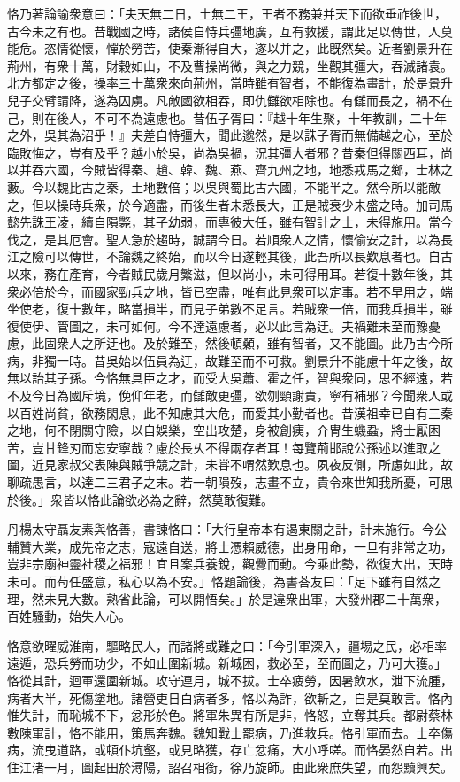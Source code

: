 \begin{pinyinscope}
恪乃著論諭衆意曰：「夫天無二日，土無二王，王者不務兼并天下而欲垂祚後世，古今未之有也。昔戰國之時，諸侯自恃兵彊地廣，互有救援，謂此足以傳世，人莫能危。恣情從懷，憚於勞苦，使秦漸得自大，遂以并之，此旣然矣。近者劉景升在荊州，有衆十萬，財穀如山，不及曹操尚微，與之力競，坐觀其彊大，吞滅諸袁。北方都定之後，操率三十萬衆來向荊州，當時雖有智者，不能復為畫計，於是景升兒子交臂請降，遂為囚虜。凡敵國欲相吞，即仇讎欲相除也。有讎而長之，禍不在己，則在後人，不可不為遠慮也。昔伍子胥曰：『越十年生聚，十年教訓，二十年之外，吳其為沼乎！』夫差自恃彊大，聞此邈然，是以誅子胥而無備越之心，至於臨敗悔之，豈有及乎？越小於吳，尚為吳禍，況其彊大者邪？昔秦但得關西耳，尚以并吞六國，今賊皆得秦、趙、韓、魏、燕、齊九州之地，地悉戎馬之鄉，士林之藪。今以魏比古之秦，土地數倍；以吳與蜀比古六國，不能半之。然今所以能敵之，但以操時兵衆，於今適盡，而後生者未悉長大，正是賊衰少未盛之時。加司馬懿先誅王淩，續自隕斃，其子幼弱，而專彼大任，雖有智計之士，未得施用。當今伐之，是其厄會。聖人急於趨時，誠謂今日。若順衆人之情，懷偷安之計，以為長江之險可以傳世，不論魏之終始，而以今日遂輕其後，此吾所以長歎息者也。自古以來，務在產育，今者賊民歲月繁滋，但以尚小，未可得用耳。若復十數年後，其衆必倍於今，而國家勁兵之地，皆已空盡，唯有此見衆可以定事。若不早用之，端坐使老，復十數年，略當損半，而見子弟數不足言。若賊衆一倍，而我兵損半，雖復使伊、管圖之，未可如何。今不達遠慮者，必以此言為迂。夫禍難未至而豫憂慮，此固衆人之所迂也。及於難至，然後頓顙，雖有智者，又不能圖。此乃古今所病，非獨一時。昔吳始以伍員為迂，故難至而不可救。劉景升不能慮十年之後，故無以詒其子孫。今恪無具臣之才，而受大吳蕭、霍之任，智與衆同，思不經遠，若不及今日為國斥境，俛仰年老，而讎敵更彊，欲刎頸謝責，寧有補邪？今聞衆人或以百姓尚貧，欲務閑息，此不知慮其大危，而愛其小勤者也。昔漢祖幸已自有三秦之地，何不閉關守險，以自娛樂，空出攻楚，身被創痍，介冑生蟣蝨，將士厭困苦，豈甘鋒刃而忘安寧哉？慮於長乆不得兩存者耳！每覽荊邯說公孫述以進取之圖，近見家叔父表陳與賊爭競之計，未甞不喟然歎息也。夙夜反側，所慮如此，故聊疏愚言，以達二三君子之末。若一朝隕歿，志畫不立，貴令來世知我所憂，可思於後。」衆皆以恪此論欲必為之辭，然莫敢復難。

丹楊太守聶友素與恪善，書諫恪曰：「大行皇帝本有遏東關之計，計未施行。今公輔贊大業，成先帝之志，寇遠自送，將士憑賴威德，出身用命，一旦有非常之功，豈非宗廟神靈社稷之福邪！宜且案兵養銳，觀釁而動。今乘此勢，欲復大出，天時未可。而苟任盛意，私心以為不安。」恪題論後，為書荅友曰：「足下雖有自然之理，然未見大數。熟省此論，可以開悟矣。」於是違衆出軍，大發州郡二十萬衆，百姓騷動，始失人心。

恪意欲曜威淮南，驅略民人，而諸將或難之曰：「今引軍深入，疆埸之民，必相率遠遁，恐兵勞而功少，不如止圍新城。新城困，救必至，至而圖之，乃可大獲。」恪從其計，迴軍還圍新城。攻守連月，城不拔。士卒疲勞，因暑飲水，泄下流腫，病者大半，死傷塗地。諸營吏日白病者多，恪以為詐，欲斬之，自是莫敢言。恪內惟失計，而恥城不下，忿形於色。將軍朱異有所是非，恪怒，立奪其兵。都尉蔡林數陳軍計，恪不能用，策馬奔魏。魏知戰士罷病，乃進救兵。恪引軍而去。士卒傷病，流曳道路，或頓仆坑壑，或見略獲，存亡忿痛，大小呼嗟。而恪晏然自若。出住江渚一月，圖起田於潯陽，詔召相銜，徐乃旋師。由此衆庶失望，而怨黷興矣。


\end{pinyinscope}
